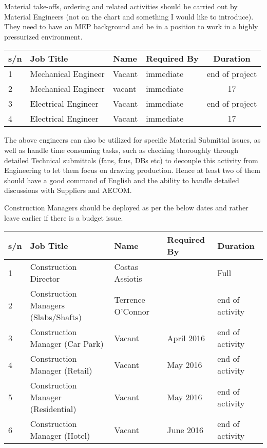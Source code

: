Material take-offs, ordering and related activities should be carried out by Material Engineers (not on the chart and something I would like to introduce). They need to have an MEP background and be in a position to work in a highly pressurized environment. 


\begin{longtable}{lll lc}
\toprule
\rowcolor{thetableheadbgcolor}s/n   &  Job Title                                                      & Name           &Required By    &  Duration\\
\midrule
1     &   Mechanical Engineer                                    & Vacant         &immediate       & end of project  \\
2     &   Mechanical Engineer                                    & vacant         & immediate       &17  \\ 
3     &  Electrical Engineer                                        & Vacant         & immediate      &end of project  \\ 
4     &  Electrical Engineer                                        & Vacant         & immediate      &17 \\
\bottomrule
\end{longtable}

The above engineers can also be utilized for specific Material Submittal issues, as well as handle time consuming tasks, such as checking thoroughly through detailed Technical submittals (fans, fcus, DBs etc) to decouple this activity from Engineering to let them focus on drawing production. Hence at least two of them should have a good command of English and the ability to handle detailed discussions with Suppliers and AECOM.

Construction Managers should be deployed as per the below dates and rather leave earlier if there is a budget issue. 

\begin{longtable}{lll ll}
\toprule
s/n   &  Job Title                                                      & Name                       &Required By    &  Duration\\
\midrule
1     &   Construction Director                                   & Costas Assiotis         &    & Full  \\
2     &   Construction Managers (Slabs/Shafts)           & Terrence O'Connor    &    & end of activity  \\ 
3     &  Construction Manager (Car Park)                   & Vacant                      & April 2016   & end of activity \\ 
4     &  Construction Manager (Retail)                       & Vacant                      & May 2016    & end of activity\\
5     &  Construction Manager (Residential)               & Vacant                      & May 2016   & end of activity\\
6     &  Construction Manager (Hotel)                       & Vacant                      &  June 2016   & end of activity\\
\bottomrule
\end{longtable}


